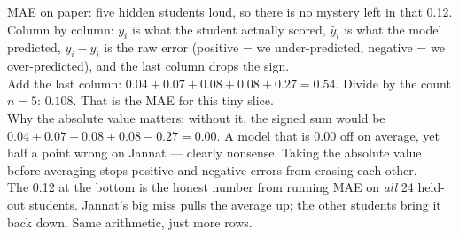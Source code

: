 \documentclass[aspectratio=169,11pt]{beamer}
\begin{document}
\begin{frame}{MAE on paper: five hidden students}
{    loud, so there is no mystery left in that 0.12.\\
    Column by column: $y_i$ is what the student actually scored, $\hat{y}_i$
    is what the model predicted, $y_i-\hat{y}_i$ is the raw error
    (positive = we under-predicted, negative = we over-predicted), and the
    last column drops the sign.\\
    Add the last column: $0.04+0.07+0.08+0.08+0.27=0.54$. Divide by the
    count $n=5$: $0.108$. That is the MAE for this tiny slice.\\
    Why the absolute value matters: without it, the signed sum would be
    $0.04+0.07+0.08+0.08-0.27 = 0.00$. A model that is 0.00 off on average,
    yet half a point wrong on Jannat --- clearly nonsense. Taking the absolute
    value before averaging stops positive and negative errors from erasing
    each other.\\
    The 0.12 at the bottom is the honest number from running MAE on \emph{all}
    24 held-out students. Jannat's big miss pulls the average up; the other
    students bring it back down. Same arithmetic, just more rows.}
\end{frame}
\end{document}
